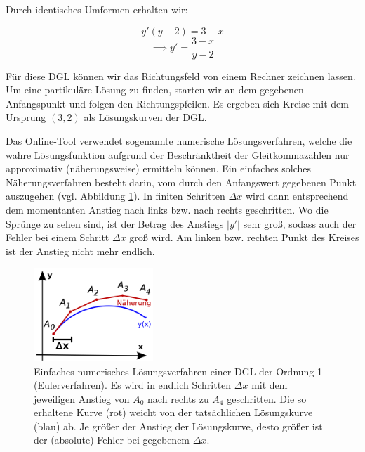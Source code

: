 \item

Durch identisches Umformen erhalten wir:

$$y'(y-2) = 3-x$$
$$\implies y' = \frac{3-x}{y-2}$$

Für diese DGL können wir das Richtungsfeld von einem Rechner zeichnen lassen. Um eine partikuläre Lösung zu finden, starten wir an dem gegebenen Anfangspunkt und folgen den Richtungspfeilen. Es ergeben sich Kreise mit dem Ursprung $(3, 2)$ als Lösungskurven der DGL.

Das Online-Tool verwendet sogenannte numerische Lösungsverfahren, welche die wahre Lösungsfunktion aufgrund der Beschränktheit der Gleitkommazahlen nur approximativ (näherungsweise) ermitteln können. Ein einfaches solches Näherungsverfahren besteht darin, vom durch den Anfangswert gegebenen Punkt auszugehen (vgl. Abbildung \ref{ex-ode-slope-field-1-img-b}). In finiten Schritten $\Delta x$ wird dann entsprechend dem momentanten Anstieg nach links bzw. nach rechts geschritten. Wo die Sprünge zu sehen sind, ist der Betrag des Anstiegs $|y'|$ sehr groß, sodass auch der Fehler bei einem Schritt $\Delta x$ groß wird. Am linken bzw. rechten Punkt des Kreises ist der Anstieg nicht mehr endlich.

\begin{figure}[ht]
	\centering
	\includegraphics[width=0.4\textwidth]{../pool/ex-ode-slope-field-1-img-b.png}
	\caption{Einfaches numerisches Lösungsverfahren einer DGL der Ordnung 1 (Eulerverfahren). Es wird in endlich Schritten $\Delta x$ mit dem jeweiligen Anstieg von $A_0$ nach rechts zu $A_4$ geschritten. Die so erhaltene Kurve (rot) weicht von der tatsächlichen Lösungskurve (blau) ab. Je größer der Anstieg der Lösungskurve, desto größer ist der (absolute) Fehler bei gegebenem $\Delta x$.}
	\label{ex-ode-slope-field-1-img-b}
\end{figure}

